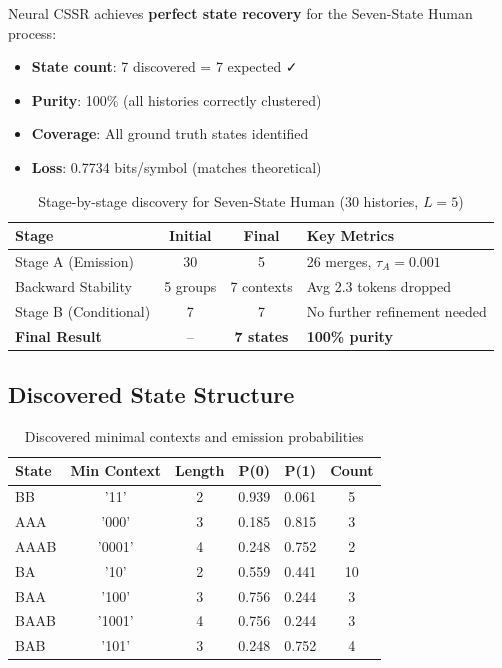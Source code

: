 \documentclass[11pt,a4paper]{report}
\theoremstyle{definition}
\begin{document}
\begin{keyresult}
Neural CSSR achieves \textbf{perfect state recovery} for the Seven-State Human process:
\begin{itemize}
    \item \textbf{State count}: 7 discovered = 7 expected ✓
    \item \textbf{Purity}: 100\% (all histories correctly clustered)
    \item \textbf{Coverage}: All ground truth states identified
    \item \textbf{Loss}: 0.7734 bits/symbol (matches theoretical)
\end{itemize}
\end{keyresult}

\begin{table}[htbp]
\centering
\caption{Stage-by-stage discovery for Seven-State Human (30 histories, $L=5$)}
\label{tab:seven-state-stages}
\begin{tabular}{@{}lccl@{}}
\toprule
\textbf{Stage} & \textbf{Initial} & \textbf{Final} & \textbf{Key Metrics} \\
\midrule
Stage A (Emission) & 30 & 5 & 26 merges, $\tau_A = 0.001$ \\
Backward Stability & 5 groups & 7 contexts & Avg 2.3 tokens dropped \\
Stage B (Conditional) & 7 & 7 & No further refinement needed \\
\midrule
\textbf{Final Result} & -- & \textbf{7 states} & \textbf{100\% purity} \\
\bottomrule
\end{tabular}
\end{table}

\subsection{Discovered State Structure}

\begin{table}[htbp]
\centering
\caption{Discovered minimal contexts and emission probabilities}
\label{tab:seven-state-discovered}
\begin{tabular}{@{}lccccc@{}}
\toprule
\textbf{State} & \textbf{Min Context} & \textbf{Length} & \textbf{P(0)} & \textbf{P(1)} & \textbf{Count} \\
\midrule
BB & '11' & 2 & 0.939 & 0.061 & 5 \\
AAA & '000' & 3 & 0.185 & 0.815 & 3 \\
AAAB & '0001' & 4 & 0.248 & 0.752 & 2 \\
BA & '10' & 2 & 0.559 & 0.441 & 10 \\
BAA & '100' & 3 & 0.756 & 0.244 & 3 \\
BAAB & '1001' & 4 & 0.756 & 0.244 & 3 \\
BAB & '101' & 3 & 0.248 & 0.752 & 4 \\
\bottomrule
\end{tabular}
\end{table}
\end{document}
